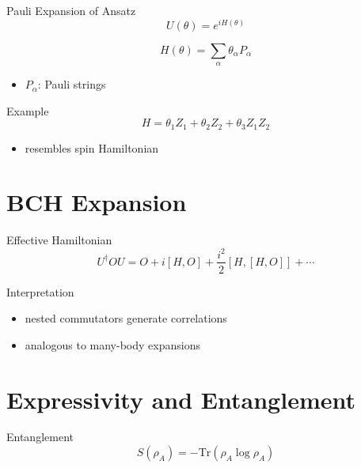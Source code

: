 \documentclass{beamer}
\begin{document}
\begin{frame}{Pauli Expansion of Ansatz}
\[
U(\theta) = e^{iH(\theta)}
\]

\[
H(\theta) = \sum_\alpha \theta_\alpha P_\alpha
\]

\begin{itemize}
\item $P_\alpha$: Pauli strings
\end{itemize}
\end{frame}


\begin{frame}{Example}
\[
H = \theta_1 Z_1 + \theta_2 Z_2 + \theta_3 Z_1Z_2
\]

\begin{itemize}
\item resembles spin Hamiltonian
\end{itemize}
\end{frame}

\section{BCH Expansion}

\begin{frame}{Effective Hamiltonian}
\[
U^\dagger O U = O + i[H,O] + \frac{i^2}{2}[H,[H,O]] + \cdots
\]
\end{frame}


\begin{frame}{Interpretation}
\begin{itemize}
\item nested commutators generate correlations
\item analogous to many-body expansions
\end{itemize}
\end{frame}

\section{Expressivity and Entanglement}

\begin{frame}{Entanglement}
\[
S(\rho_A) = -\mathrm{Tr}(\rho_A \log \rho_A)
\]
\end{frame}
\end{document}
